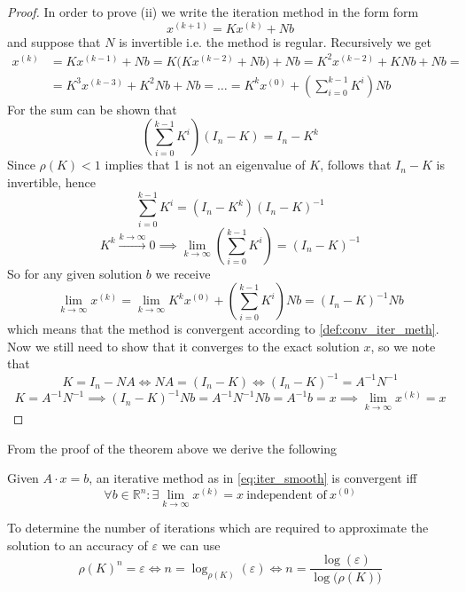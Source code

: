 \begin{proof}
   In order to prove (ii) we write the iteration method in the form form
   \[x^{(k+1)} = Kx^{(k)} + Nb\]
   and suppose that \(N\) is invertible i.e. the method is regular.
   Recursively we get
   \begin{equation*}
      \begin{split}
         x^{(k)} & = Kx^{(k-1)} + Nb = K\big(Kx^{(k-2)} + Nb\big) + Nb = K^2x^{(k-2)} + KNb + Nb = \\
                 & = K^3x^{(k-3)} + K^2Nb + Nb = \ldots = K^kx^{(0)} + \left(\sum_{i=0}^{k-1} K^i\right) Nb
      \end{split}
   \end{equation*}
   For the sum can be shown that
   \[\left(\sum_{i=0}^{k-1} K^i\right) (I_n - K)= I_n - K^k\]
   Since \(\rho(K) < 1\) implies that 1 is not an eigenvalue of \(K\), follows that \(I_n - K\) is invertible, hence
   \[\sum_{i=0}^{k-1} K^i = (I_n - K^k)(I_n - K)^{-1}\]
   \[K^k \xrightarrow{k \to \infty} 0 \implies \lim_{k \to \infty} \left(\sum_{i=0}^{k-1} K^i\right) = (I_n - K)^{-1}\]
   So for any given solution \(b\) we receive
   \[\lim_{k \to \infty} x^{(k)} = \lim_{k \to \infty} K^kx^{(0)} + \left(\sum_{i=0}^{k-1} K^i\right) Nb = (I_n - K)^{-1}Nb\]
   which means that the method is convergent according to \cref{def:conv_iter_meth}.
   Now we still need to show that it converges to the exact solution \(x\), so we note that
   \[K = I_n - NA \iff NA = (I_n - K) \iff (I_n - K)^{-1} = A^{-1}N^{-1}\]
   \[K = A^{-1}N^{-1} \implies (I_n - K)^{-1}Nb = A^{-1}N^{-1}Nb = A^{-1}b = x \implies \lim_{k \to \infty} x^{(k)} = x\]
\end{proof}

From the proof of the theorem above we derive the following
\begin{definition}\label{def:conv_iter_meth}
   Given \(A \cdot x = b\), an iterative method as in \cref{eq:iter_smooth} is convergent iff
   \[\forall b \in \mathbb{R}^n: \exists \lim_{k \to \infty} x^{(k)} = x~\text{independent of}~x^{(0)}\]
\end{definition}
\begin{remark}
   To determine the number of iterations which are required to approximate the solution to an accuracy of \(\varepsilon\) we can use
   \[\rho(K)^n = \varepsilon \iff n = \log_{\rho(K)}(\varepsilon) \iff n = \frac{\log(\varepsilon)}{\log\big(\rho(K)\big)}\]
\end{remark}

